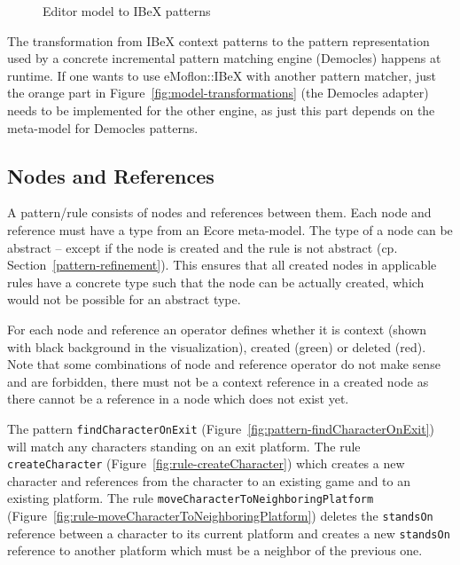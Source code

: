 \begin{figure}[h!]
	\centering
	
	\caption{Editor model to IBeX patterns}
	\label{fig:editor-model-to-IBeXPatterns}
\end{figure}

\noindent
The transformation from IBeX context patterns to the pattern representation used by a concrete incremental pattern matching engine (\eg Democles) happens at runtime.
If one wants to use eMoflon::IBeX with another pattern matcher, just the orange part in Figure~\ref{fig:model-transformations} (the Democles adapter) needs to be implemented for the other engine, as just this part depends on the meta-model for Democles patterns.

\subsection{Nodes and References}
A pattern/rule consists of nodes and references between them.
Each node and reference must have a type from an Ecore meta-model.
The type of a node can be abstract -- except if the node is created and the rule is not abstract (cp. Section~\ref{pattern-refinement}).
This ensures that all created nodes in applicable rules have a concrete type such that the node can be actually created, which would not be possible for an abstract type.

For each node and reference an operator defines whether it is context (shown with black background in the visualization), created (green) or deleted (red).
Note that some combinations of node and reference operator do not make sense and are forbidden, \eg there must not be a context reference in a created node as there cannot be a reference in a node which does not exist yet.

The pattern \texttt{findCharacterOnExit} (Figure~\ref{fig:pattern-findCharacterOnExit}) will match any characters standing on an exit platform.
The rule \texttt{createCharacter} (Figure~\ref{fig:rule-createCharacter}) which creates a new character and references from the character to an existing game and to an existing platform.
The rule \texttt{moveCharacterToNeighboringPlatform} (Figure~\ref{fig:rule-moveCharacterToNeighboringPlatform}) deletes the \texttt{standsOn} reference between a character to its current platform and creates a new \texttt{standsOn} reference to another platform which must be a neighbor of the previous one.

